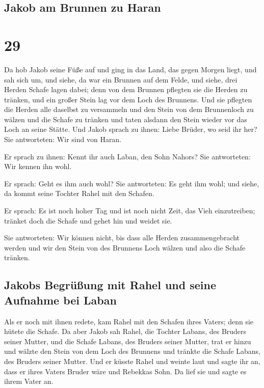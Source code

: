 \hypertarget{jakob-am-brunnen-zu-haran}{%
\subsection{Jakob am Brunnen zu Haran}\label{jakob-am-brunnen-zu-haran}}

\hypertarget{section-28}{%
\section{29}\label{section-28}}

 Da hob Jakob seine Füße auf und ging in das Land, das
gegen Morgen liegt,  und sah sich um, und siehe, da war
ein Brunnen auf dem Felde, und siehe, drei Herden Schafe lagen dabei;
denn von dem Brunnen pflegten sie die Herden zu tränken, und ein großer
Stein lag vor dem Loch des Brunnens.  Und sie pflegten die
Herden alle daselbst zu versammeln und den Stein von dem Brunnenloch zu
wälzen und die Schafe zu tränken und taten alsdann den Stein wieder vor
das Loch an seine Stätte.  Und Jakob sprach zu ihnen:
Liebe Brüder, wo seid ihr her? Sie antworteten: Wir sind von Haran.

 Er sprach zu ihnen: Kennt ihr auch Laban, den Sohn
Nahors? Sie antworteten: Wir kennen ihn wohl.

 Er sprach: Geht es ihm auch wohl? Sie antworteten: Es
geht ihm wohl; und siehe, da kommt seine Tochter Rahel mit den Schafen.

 Er sprach: Es ist noch hoher Tag und ist noch nicht Zeit,
das Vieh einzutreiben; tränket doch die Schafe und gehet hin und weidet
sie.

 Sie antworteten: Wir können nicht, bis dass alle Herden
zusammengebracht werden und wir den Stein von des Brunnens Loch wälzen
und also die Schafe tränken.

\hypertarget{jakobs-begruxfcuxdfung-mit-rahel-und-seine-aufnahme-bei-laban}{%
\subsection{Jakobs Begrüßung mit Rahel und seine Aufnahme bei
Laban}\label{jakobs-begruxfcuxdfung-mit-rahel-und-seine-aufnahme-bei-laban}}

 Als er noch mit ihnen redete, kam Rahel mit den Schafen
ihres Vaters; denn sie hütete die Schafe.  Da aber Jakob
sah Rahel, die Tochter Labans, des Bruders seiner Mutter, und die Schafe
Labans, des Bruders seiner Mutter, trat er hinzu und wälzte den Stein
von dem Loch des Brunnens und tränkte die Schafe Labans, des Bruders
seiner Mutter.  Und er küsste Rahel und weinte laut
 und sagte ihr an, dass er ihres Vaters Bruder wäre und
Rebekkas Sohn. Da lief sie und sagte es ihrem Vater an.

